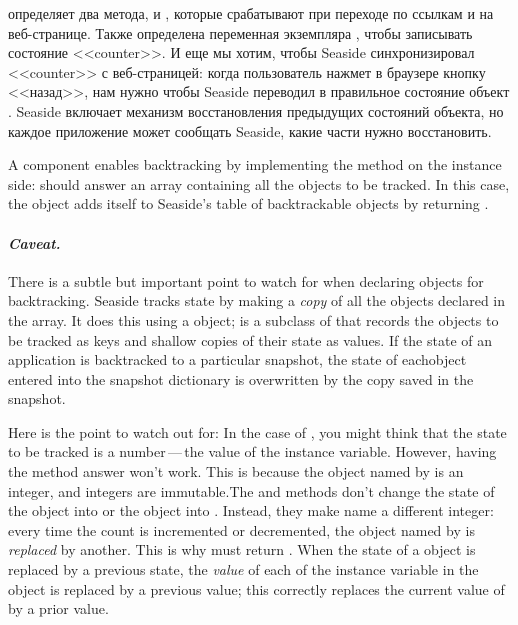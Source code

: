 \documentclass[a4paper,10pt,twoside]{book}
\begin{document}
 определяет два метода,  и ,
которые срабатывают при переходе по ссылкам \link{++} и \link{--\,--}
на веб-странице.
Также определена переменная экземпляра ,
чтобы записывать состояние <<counter>>.
И еще мы хотим, чтобы Seaside синхронизировал <<counter>> с веб-страницей: когда пользователь нажмет в браузере кнопку <<назад>>,
нам нужно чтобы Seaside переводил в правильное состояние объект .
Seaside включает механизм восстановления предыдущих состояний объекта, но каждое приложение может сообщать Seaside, какие части нужно восстановить.

A component enables backtracking by implementing the  method on the instance
side:
 should answer an array containing all the objects to be tracked.
In this case, the  object adds itself to Seaside's table of backtrackable
objects by returning .

\paragraph{\emph{Caveat.}}
There is a subtle but important point to watch for when declaring objects for
backtracking.
Seaside tracks state by making a \emph{copy} of all the objects declared in the
 array.
It does this using a  object;  is a subclass of
 that records the objects to be tracked as keys and shallow
copies of their state as values.
If the state of an application is backtracked to a particular snapshot, the state of eachobject entered into the snapshot dictionary is overwritten by the copy saved in the
snapshot.

Here is the point to watch out for:
In the case of , you might think that the state to be tracked is a
number\,---\,the value of the  instance variable.
However, having the  method answer  won't work.  
This is because the object named by  is an integer, and integers are
immutable.The  and  methods don't change the state of the
object 
into  or the object  into .
Instead, they make  name a different integer: 
every time the count is incremented or decremented, the object named by  is
\emph{replaced} by another.
This is why  must return .
When the state of a \mbox{} object is replaced by a previous state, the
\emph{value} of each of the instance variable in the object is replaced by a previous
value; this correctly replaces the current value of  by a prior value.
\end{document}
